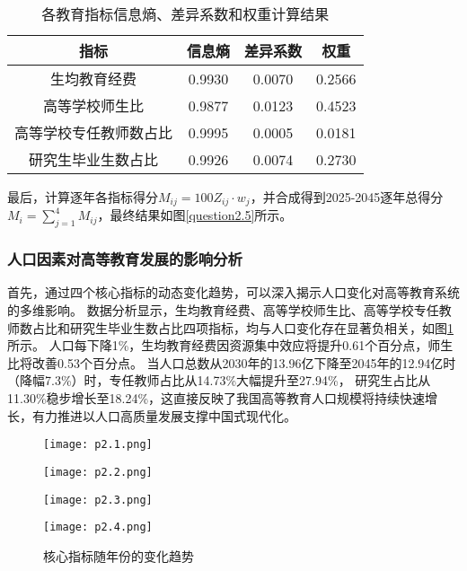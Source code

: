 \documentclass[withoutpreface,bwprint]{cumcmthesis} %
\newcommand{\upcite}[1]{\textsuperscript{\textsuperscript{\cite{#1}}}}
\begin{document}
\begin{table}[H]
    \fontsize{10}{12}\selectfont
    \centering
    \caption{各教育指标信息熵、差异系数和权重计算结果}
    \begin{tabular}{|c|c|c|c|}
    \hline
    指标          & 信息熵    & 差异系数   & 权重     \\ \hline
    生均教育经费      & 0.9930 & 0.0070 & 0.2566 \\ \hline
    高等学校师生比     & 0.9877 & 0.0123 & 0.4523 \\ \hline
    高等学校专任教师数占比 & 0.9995 & 0.0005 & 0.0181 \\ \hline
    研究生毕业生数占比   & 0.9926 & 0.0074 & 0.2730 \\ \hline
    \end{tabular}
    \label{question2.1}
\end{table}

最后，计算逐年各指标得分$M_{ij}=100 Z_{ij} \cdot w_j $，并合成得到2025-2045逐年总得分$M_i=\sum_{j=1}^4 M_{ij}$，最终结果如图\ref{question2.5}所示。

\subsubsection{人口因素对高等教育发展的影响分析}

首先，通过四个核心指标的动态变化趋势，可以深入揭示人口变化对高等教育系统的多维影响。
数据分析显示，生均教育经费、高等学校师生比、高等学校专任教师数占比和研究生毕业生数占比四项指标，均与人口变化存在显著负相关，如图\ref{question2.0}所示。
人口每下降1\%，生均教育经费因资源集中效应将提升0.61个百分点，师生比将改善0.53个百分点。
当人口总数从2030年的13.96亿下降至2045年的12.94亿时（降幅7.3\%）时，专任教师占比从14.73\%大幅提升至27.94\%，
研究生占比从11.30\%稳步增长至18.24\%，这直接反映了我国高等教育人口规模将持续快速增长，有力推进以人口高质量发展支撑中国式现代化\upcite{高等教育规模发展}。

\begin{figure}[H]
	\caption{核心指标随年份的变化趋势}
	\label{question2.0}
	\subfigure
	{
		\begin{minipage}[b]{.3\linewidth}
			\centering
			\texttt{[image: p2.1.png]}
		\end{minipage}
	} \quad \quad \quad \quad \quad \quad \quad 
	\subfigure
	{
		\begin{minipage}[b]{.3\linewidth}
			\texttt{[image: p2.2.png]}
		\end{minipage}
	}

	\subfigure
	{
		\begin{minipage}[b]{.3\linewidth}
			
			\texttt{[image: p2.3.png]}
		\end{minipage}
	} \quad \quad \quad \quad \quad \quad \quad
	\subfigure
	{
	\begin{minipage}[b]{.3\linewidth}
		\texttt{[image: p2.4.png]}
	\end{minipage}
	}
\end{figure}
\end{document}
